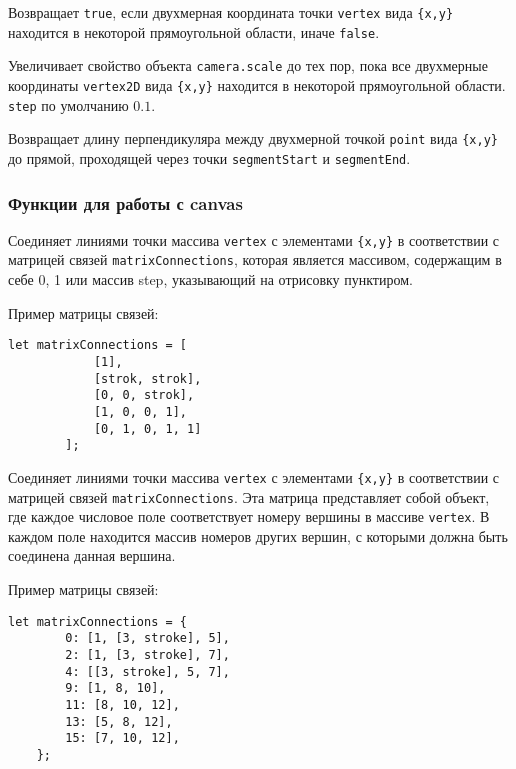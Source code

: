 Возвращает \texttt{true}, если двухмерная координата точки \texttt{vertex} вида \texttt{\{x,y\}} находится в некоторой прямоугольной области, иначе \texttt{false}.

Увеличивает свойство объекта \texttt{camera.scale} до тех пор, пока все двухмерные координаты \texttt{vertex2D} вида \texttt{\{x,y\}}  находится в некоторой прямоугольной области. \texttt{step} по умолчанию $0.1$.

Возвращает длину перпендикуляра между двухмерной точкой \texttt{point} вида \texttt{\{x,y\}} до прямой, проходящей через точки \texttt{segmentStart} и \texttt{segmentEnd}.

\subsubsection{Функции для работы с canvas}

Соединяет линиями точки массива \texttt{vertex} с элементами \texttt{\{x,y\}} в соответствии с матрицей связей \texttt{matrixConnections}, которая является массивом, содержащим в себе 0, 1 или массив step, указывающий на отрисовку пунктиром.

Пример матрицы связей:
\begin{lstlisting}[numbers=none]
	let matrixConnections = [
			[1],
			[strok, strok],
			[0, 0, strok],
			[1, 0, 0, 1],
			[0, 1, 0, 1, 1]
		];
	\end{lstlisting}

Соединяет линиями точки массива \texttt{vertex} с элементами \texttt{\{x,y\}} в соответствии с матрицей связей \texttt{matrixConnections}. Эта матрица представляет собой объект, где каждое числовое поле соответствует номеру вершины в массиве \texttt{vertex}. В каждом поле находится массив номеров других вершин, с которыми должна быть соединена данная вершина.

Пример матрицы связей:
\begin{lstlisting}[numbers=none]
	let matrixConnections = {
		0: [1, [3, stroke], 5],
		2: [1, [3, stroke], 7],
		4: [[3, stroke], 5, 7],
		9: [1, 8, 10],
		11: [8, 10, 12],
		13: [5, 8, 12],
		15: [7, 10, 12],
	};
	\end{lstlisting}

